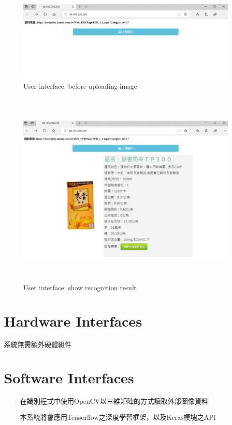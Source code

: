 \documentclass{scrreprt}
\begin{document}
\begin{CJK}{UTF8}{bkai}
\begin{figure}[ht]
\begin{center}
\includegraphics[width=14cm]{userinterface1.png}
\end{center}
\caption{User interface: before uploading image}
\label{fig:1}
\end{figure}

\begin{figure}[h]
\begin{center}
\includegraphics[width=14cm,height=10cm]{userinterface2.png}
\end{center}
\caption{User interface: show recognition result}
\label{fig:1}
\end{figure}

\section{Hardware Interfaces}
系統無需額外硬體組件
\section{Software Interfaces}
\begin{itemize}
\item[-] 在識別程式中使用OpenCV以三維矩陣的方式讀取外部圖像資料
\item[-] 本系統將會應用Tensorflow之深度學習框架，以及Keras模塊之API
\end{itemize}



\end{CJK}
\end{document}
